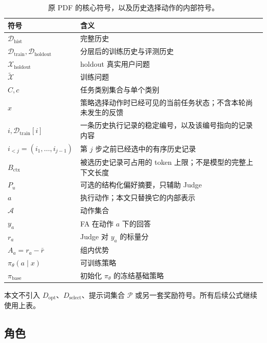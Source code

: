 \documentclass[11pt,UTF8,fontset=none]{ctexart}
\newcommand{\Dhist}{\mathcal D_{\mathrm{hist}}}
\newcommand{\Dtrain}{\mathcal D_{\mathrm{train}}}
\newcommand{\Dholdout}{\mathcal D_{\mathrm{holdout}}}
\newcommand{\Xholdout}{\mathcal X_{\mathrm{holdout}}}
\newcommand{\Xsim}{\widetilde{\mathcal X}}
\newcommand{\policy}{\pi_{\theta}}
\newcommand{\basepolicy}{\pi_{\mathrm{base}}}
\begin{document}
\begin{table}[ht]
  \centering
  \caption{原 PDF 的核心符号，以及历史选择动作的内部符号。}
  \begin{tabularx}{\textwidth}{@{}L{0.23\textwidth}Y@{}}
    \toprule
    符号 & 含义 \\
    \midrule
    \(\Dhist\) & 完整历史 \\
    \(\Dtrain,\Dholdout\) & 分层后的训练历史与评测历史 \\
    \(\Xholdout\) & holdout 真实用户问题 \\
    \(\Xsim\) & 训练问题 \\
    \(C,c\) & 任务类别集合与单个类别 \\
    \(x\) & 策略选择动作时已经可见的当前任务状态；不含本轮尚未发生的反馈 \\
    \(i,\Dtrain[i]\) & 一条历史执行记录的稳定编号，以及该编号指向的记录内容 \\
    \(i_{<j}=(i_1,\ldots,i_{j-1})\) & 第 \(j\) 步之前已经选中的有序历史记录 \\
    \(B_{\mathrm{ctx}}\) & 被选历史记录可占用的 token 上限；不是模型的完整上下文长度 \\
    \(P_u\) & 可选的结构化偏好摘要，只辅助 Judge \\
    \(a\) & 执行动作；本文只替换它的内部表示 \\
    \(\mathcal A\) & 动作集合 \\
    \(y_a\) & FA 在动作 \(a\) 下的回答 \\
    \(r_a\) & Judge 对 \(y_a\) 的标量分 \\
    \(A_a=r_a-\bar r\) & 组内优势 \\
    \(\policy(a\mid x)\) & 可训练策略 \\
    \(\basepolicy\) & 初始化 \(\policy\) 的冻结基础策略 \\
    \bottomrule
  \end{tabularx}
\end{table}

本文不引入 \(D_{\mathrm{opt}}\)、\(D_{\mathrm{select}}\)、提示词集合
\(\mathcal P\) 或另一套奖励符号。所有后续公式继续使用上表。

\subsection{角色}
\end{document}
